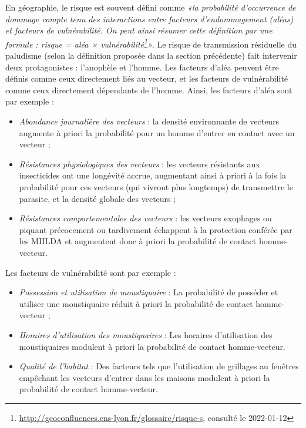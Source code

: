 \documentclass[12pt,twoside]{reedthesis}
\providecommand{\tightlist}{%
  \setlength{\itemsep}{0pt}\setlength{\parskip}{0pt}}
\begin{document}
En géographie, le risque est souvent défini comme \emph{«la probabilité d'occurrence de dommage compte tenu des interactions entre facteurs d'endommagement (aléas) et facteurs de vulnérabilité. On peut ainsi résumer cette définition par une formule : risque = aléa × vulnérabilité\footnote{\url{http://geoconfluences.ens-lyon.fr/glossaire/risque-s}, consulté le 2022-01-12}»}. Le risque de transmission résiduelle du paludisme (selon la définition proposée dans la section précédente) fait intervenir deux protagonistes : l'anophèle et l'homme. Les facteurs d'aléa peuvent être définis comme ceux directement liés au vecteur, et les facteurs de vulnérabilité comme ceux directement dépendants de l'homme. Ainsi, les facteurs d'aléa sont par exemple :
\begin{itemize}
\tightlist
\item
  \emph{Abondance journalière des vecteurs} : la densité environnante de vecteurs augmente à priori la probabilité pour un homme d'entrer en contact avec un vecteur ;
\item
  \emph{Résistances physiologiques des vecteurs} : les vecteurs résistants aux insecticides ont une longévité accrue, augmentant ainsi à priori à la fois la probabilité pour ces vecteurs (qui vivront plus longtemps) de transmettre le parasite, et la densité globale des vecteurs ;
\item
  \emph{Résistances comportementales des vecteurs} : les vecteurs exophages ou piquant précocement ou tardivement échappent à la protection conférée par les MIILDA et augmentent donc à priori la probabilité de contact homme-vecteur.\\
\end{itemize}
Les facteurs de vulnérabilité sont par exemple :
\begin{itemize}
\tightlist
\item
  \emph{Possession et utilisation de moustiquaire} : La probabilité de posséder et utiliser une moustiquaire réduit à priori la probabilité de contact homme-vecteur ;
\item
  \emph{Horaires d'utilisation des moustiquaires} : Les horaires d'utilisation des moustiquaires modulent à priori la probabilité de contact homme-vecteur.
\item
  \emph{Qualité de l'habitat} : Des facteurs tels que l'utilisation de grillages au fenêtres empêchant les vecteurs d'entrer dans les maisons modulent à priori la probabilité de contact homme-vecteur.\\
\end{itemize}
\end{document}
